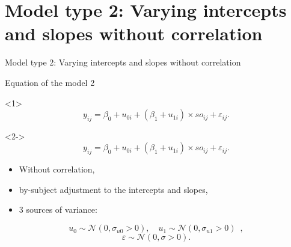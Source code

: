 \documentclass[unknownkeysallowed]{beamer}
\begin{document}
\section{Model type 2: Varying intercepts and slopes without correlation}

\begin{frame}[plain]{}
    \begin{center}
        \LARGE Model type 2: Varying intercepts and slopes without correlation
    \end{center}
\end{frame}

\addtocounter{framenumber}{-1}
\begin{frame}{Equation of the model 2}
\begin{onlyenv}<1>
{\[y_{ij}=\beta_0+ u_{0i} + (\beta_1 + u_{1i})\times so_{ij}+\varepsilon_{ij}.\]}
\end{onlyenv}

\medskip
\medskip
\begin{onlyenv}<2->
{\[y_{ij}=\beta_0+ u_{0i} + (\beta_1 + u_{1i})\times so_{ij}+\varepsilon_{ij}.\]}
 \begin{itemize}
        \item Without correlation,
        \item by-subject adjustment to the intercepts and slopes,
        \item $3$ sources of variance:
    \end{itemize}
$$u_{0} {\sim} \mathcal{N}(0, \sigma_{u0}>0), \quad u_{1} {\sim} \mathcal{N}(0, \sigma_{u1}>0)\enspace,$$
\vspace{-0.5cm}
$$\varepsilon {\sim} \mathcal{N}(0,\sigma>0).$$
\end{onlyenv}
\end{frame}
\end{document}
